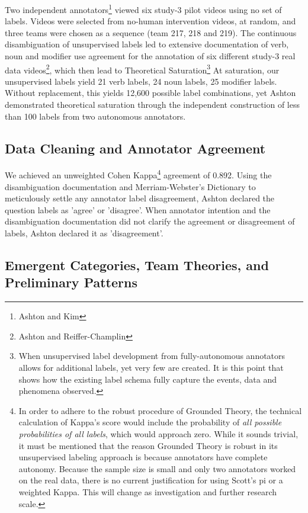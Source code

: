 Two independent annotators\footnote{Ashton and Kim} viewed six study-3 pilot videos using no set of labels. Videos were selected from no-human intervention videos, at random, and three teams were chosen as a sequence (team 217, 218 and 219). The continuous disambiguation of unsupervised labels led to extensive documentation of verb, noun and modifier use agreement for the annotation of six different study-3 real data videos\footnote{Ashton and Reiffer-Champlin}, which then lead to Theoretical Saturation\footnote{When unsupervised label development from fully-autonomous annotators allows for additional labels, yet very few are created. It is this point that shows how the existing label schema fully capture the events, data and phenomena observed.}  At saturation, our unsupervised labels yield 21 verb labels, 24 noun labels, 25 modifier labels. Without replacement, this yields 12,600 possible label combinations, yet Ashton demonstrated theoretical saturation through the independent construction of less than 100 labels from two autonomous annotators.


\subsection{Data Cleaning and Annotator Agreement}
We achieved an unweighted Cohen Kappa\footnote{In order to adhere to the robust procedure of Grounded Theory, the technical calculation of Kappa's score would include the probability of \textit{all possible probabilities of all labels}, which would approach zero. While it sounds trivial, it must be mentioned that the reason Grounded Theory is robust in its unsupervised labeling approach is because annotators have complete autonomy. Because the sample size is small and only two annotators worked on the real data, there is no current justification for using Scott's pi or a weighted Kappa. This will change as investigation and further research scale.} agreement of 0.892. Using the disambiguation documentation and Merriam-Webster's Dictionary to meticulously settle any annotator label disagreement, Ashton declared the question labels as 'agree' or 'disagree'. When annotator intention and the disambiguation documentation did not clarify the agreement or disagreement of labels, Ashton declared it as 'disagreement'. 



\subsection{Emergent Categories, Team Theories, and Preliminary Patterns}

